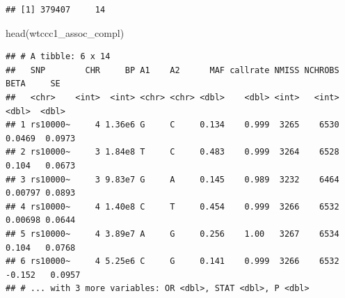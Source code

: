 \documentclass[
]{book}
\newenvironment{Shaded}{\begin{snugshade}}{\end{snugshade}}
\newcommand{\CommentTok}[1]{\textcolor[rgb]{0.56,0.35,0.01}{\textit{#1}}}
\newcommand{\FunctionTok}[1]{\textcolor[rgb]{0.00,0.00,0.00}{#1}}
\newcommand{\NormalTok}[1]{#1}
\newcommand{\OtherTok}[1]{\textcolor[rgb]{0.56,0.35,0.01}{#1}}
\newcommand{\SpecialCharTok}[1]{\textcolor[rgb]{0.00,0.00,0.00}{#1}}
\newcommand{\StringTok}[1]{\textcolor[rgb]{0.31,0.60,0.02}{#1}}
\begin{document}
\begin{Shaded}
\end{Shaded}

\begin{verbatim}
## [1] 379407     14
\end{verbatim}

\begin{Shaded}
\begin{Highlighting}[]
\FunctionTok{head}\NormalTok{(wtccc1\_assoc\_compl)}
\end{Highlighting}
\end{Shaded}

\begin{verbatim}
## # A tibble: 6 x 14
##   SNP        CHR     BP A1    A2      MAF callrate NMISS NCHROBS     BETA     SE
##   <chr>    <int>  <int> <chr> <chr> <dbl>    <dbl> <int>   <int>    <dbl>  <dbl>
## 1 rs10000~     4 1.36e6 G     C     0.134    0.999  3265    6530  0.0469  0.0973
## 2 rs10000~     3 1.84e8 T     C     0.483    0.999  3264    6528  0.104   0.0673
## 3 rs10000~     3 9.83e7 G     A     0.145    0.989  3232    6464  0.00797 0.0893
## 4 rs10000~     4 1.40e8 C     T     0.454    0.999  3266    6532  0.00698 0.0644
## 5 rs10000~     4 3.89e7 A     G     0.256    1.00   3267    6534  0.104   0.0768
## 6 rs10000~     4 5.25e6 C     G     0.141    0.999  3266    6532 -0.152   0.0957
## # ... with 3 more variables: OR <dbl>, STAT <dbl>, P <dbl>
\end{verbatim}
\end{document}
